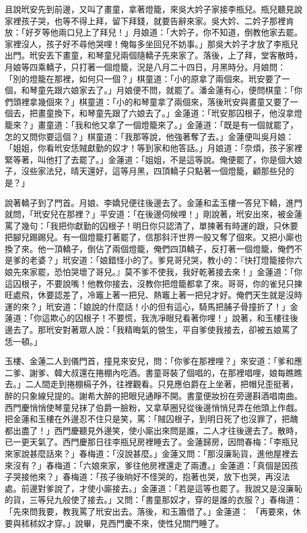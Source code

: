且說玳安先到前邊，又叫了畫童，拿著燈籠，來吳大妗子家接李瓶兒。瓶兒聽見說家裡孩子哭，也等不得上拜，留下拜錢，就要告辭來家。吳大妗、二妗子那裡肯放：「好歹等他兩口兒上了拜兒！」月娘道：「大妗子，你不知道，倒教他家去罷。家裡沒人，孩子好不尋他哭哩！俺每多坐回兒不妨事。」那吳大妗子才放了李瓶兒出門。玳安丟下畫童，和琴童兒兩個隨轎子先來家了。落後，上了拜，堂客散時，月娘等四乘轎子，只打著一個燈籠，況是八月二十四日，月黑時分。月娘問： 「別的燈籠在那裡，如何只一個？」棋童道：「小的原拿了兩個來。玳安要了一個，和琴童先跟六娘家去了。」月娘便不問，就罷了。潘金蓮有心，便問棋童：「你們頭裡拿幾個來？」棋童道：「小的和琴童拿了兩個來，落後玳安與畫童又要了一個去，把畫童換下，和琴童先跟了六娘去了。」金蓮道：「玳安那囚根子，他沒拿燈籠來？」畫童道：「我和他又拿了一個燈籠來了。」金蓮道：「既是有一個就罷了，怎的又問你要這個？」棋童道：「我那等說，他強著奪了去。」金蓮便叫吳月娘：「姐姐，你看玳安恁賊獻勤的奴才！等到家和他答話。」月娘道：「奈煩，孩子家裡緊等著，叫他打了去罷了。」金蓮道：「姐姐，不是這等說。俺便罷了，你是個大娘子，沒些家法兒，晴天還好，這等月黑，四頂轎子只點著一個燈籠，顧那些兒的是？」

說著轎子到了門首。月娘、李嬌兒便往後邊去了。金蓮和孟玉樓一答兒下轎，進門就問，「玳安兒在那裡？」平安道：「在後邊伺候哩！」剛說著，玳安出來，被金蓮罵了幾句：「我把你獻勤的囚根子！明日你只認清了，單揀著有時運的跟，只休要把腳兒踢踢兒。有一個燈籠打著罷了，信那斜汗世界一般又奪了個來。又把小廝也換了來。他一頂轎子，倒佔了兩個燈籠，俺們四頂轎子，反打著一個燈籠，俺們不是爹的老婆？」玳安道：「娘錯怪小的了。爹見哥兒哭，教小的：『快打燈籠接你六娘先來家罷，恐怕哭壞了哥兒。』莫不爹不使我，我好乾著接去來！」金蓮道：「你這囚根子，不要說嘴！他教你接去，沒教你把燈籠都拿了來。哥哥，你的雀兒只揀旺處飛，休要認差了，冷竈上著一把兒、熱竈上著一把兒才好。俺們天生就是沒時運的來？」玳安道：「娘說的什麼話！小的但有這心，騎馬把脯子骨撞折了！」金蓮道：「你這欺心的囚根子！不要慌，我洗凈眼兒看著你哩！」說著，和玉樓往後邊去了。那玳安對著眾人說：「我精晦氣的營生，平自爹使我接去，卻被五娘罵了恁一頓。」

玉樓、金蓮二人到儀門首，撞見來安兒，問：「你爹在那裡哩？」來安道：「爹和應二爹、謝爹、韓大叔還在捲棚內吃酒。書童哥裝了個唱的，在那裡唱哩，娘每瞧瞧去。」二人間走到捲棚槅子外，往裡觀看。只見應伯爵在上坐著，把帽兒歪挺著，醉的只象線兒提的。謝希大醉的把眼兒通睜不開。書童便妝扮在旁邊斟酒唱南曲。西門慶悄悄使琴童兒抹了伯爵一臉粉，又拿草圈兒從後邊悄悄兒弄在他頭上作戲。把金蓮和玉樓在外邊忍不住只是笑，罵：「賊囚根子，到明日死了也沒罪了，把醜都出盡了！」西門慶聽見外邊笑，使小廝出來問是誰，二人才往後邊去了。散時，已一更天氣了。西門慶那日往李瓶兒房裡睡去了。金蓮歸房，因問春梅：「李瓶兒來家說甚麼話來？」春梅道：「沒說甚麼。」金蓮又問：「那沒廉恥貨，進他屋裡去來沒有？」春梅道：「六娘來家，爹往他房裡還走了兩遭。」金蓮道：「真個是因孩子哭接他來？」春梅道：「孩子後晌好不怪哭的，抱著也哭，放下也哭，再沒法處。前邊對爹說了，才使小廝接去。」金蓮道：「若是這等也罷了。我說又是沒廉恥的貨，三等兒九般使了接去。」又問：「書童那奴才，穿的是誰的衣服？」春梅道：「先來問我要，教我罵了玳安出去。落後，和玉簫借了。」金蓮道： 「再要來，休要與秫秫奴才穿。」說畢，見西門慶不來，使性兒關門睡了。

